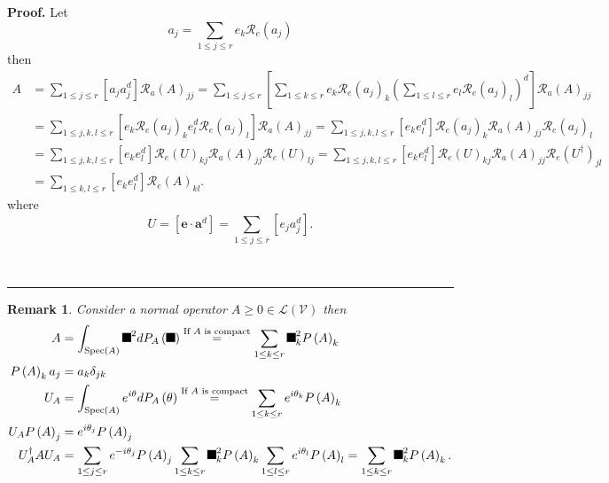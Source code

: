 \documentclass[aps,preprint]{revtex4}%
\providecommand{\U}[1]{\protect\rule{.1in}{.1in}}
\newtheorem{remark}[theorem]{Remark}
\newenvironment{proof}[1][Proof]{\noindent\textbf{#1.} }{\ \rule{0.5em}{0.5em}}
\begin{document}
\begin{proof}
Let
\begin{equation}
a_{j}=\sum_{1\leq j\leq r}e_{k}\mathcal{R}_{e}\left(  a_{j}\right)
\end{equation}
then
\begin{align}
A  &  =\sum_{1\leq j\leq r}\left[  a_{j}a_{j}^{d}\right]  \mathcal{R}%
_{a}\left(  A\right)  _{jj}=\sum_{1\leq j\leq r}\left[  \sum_{1\leq k\leq
r}e_{k}\mathcal{R}_{e}\left(  a_{j}\right)  _{k}\left(  \sum_{1\leq l\leq
r}e_{l}\mathcal{R}_{e}\left(  a_{j}\right)  _{l}\right)  ^{d}\right]
\mathcal{R}_{a}\left(  A\right)  _{jj}\\
&  =\sum_{1\leq j,k,l\leq r}\left[  e_{k}\mathcal{R}_{e}\left(  a_{j}\right)
_{k}e_{l}^{d}\mathcal{R}_{e}\left(  a_{j}\right)  _{l}\right]  \mathcal{R}%
_{a}\left(  A\right)  _{jj}=\sum_{1\leq j,k,l\leq r}\left[  e_{k}e_{l}%
^{d}\right]  \mathcal{R}_{e}\left(  a_{j}\right)  _{k}\mathcal{R}_{a}\left(
A\right)  _{jj}\mathcal{R}_{e}\left(  a_{j}\right)  _{l}\\
&  =\sum_{1\leq j,k,l\leq r}\left[  e_{k}e_{l}^{d}\right]  \mathcal{R}%
_{e}\left(  U\right)  _{kj}\mathcal{R}_{a}\left(  A\right)  _{jj}%
\mathcal{R}_{e}\left(  U\right)  _{lj}=\sum_{1\leq j,k,l\leq r}\left[
e_{k}e_{l}^{d}\right]  \mathcal{R}_{e}\left(  U\right)  _{kj}\mathcal{R}%
_{a}\left(  A\right)  _{jj}\mathcal{R}_{e}\left(  U^{\dagger}\right)  _{jl}\\
&  =\sum_{1\leq k,l\leq r}\left[  e_{k}e_{l}^{d}\right]  \mathcal{R}%
_{e}\left(  A\right)  _{kl}.
\end{align}
where
\begin{equation}
U=\left[  \mathbf{e\cdot a}^{d}\right]  =\sum_{1\leq j\leq r}\left[
e_{j}a_{j}^{d}\right]  .
\end{equation}

\end{proof}

\begin{remark}
Consider a normal operator $A\geq0\in\mathcal{L}\left(  \mathcal{V}\right)  $
then%
\begin{align}
A  &  =\int_{\operatorname*{Spec}\left(  A\right)  }\U{3c3} ^{2}dP_{A}\left(
\U{3c3} \right)  \overset{\text{If }A\text{ is compact}}{=}\sum_{1\leq k\leq
r}\U{3c3} _{k}^{2}P\left(  A\right)  _{k}\\
P\left(  A\right)  _{k}a_{j}  &  =a_{k}\delta_{jk}\\
U_{A}  &  =\int_{\operatorname*{Spec}\left(  A\right)  }e^{i\theta}%
dP_{A}\left(  \theta\right)  \overset{\text{If }A\text{ is compact}}{=}%
\sum_{1\leq k\leq r}e^{i\theta_{k}}P\left(  A\right)  _{k}\\
U_{A}P\left(  A\right)  _{j}  &  =e^{i\theta_{j}}P\left(  A\right)  _{j}\\
U_{A}^{\dagger}AU_{A}  &  =\sum_{1\leq j\leq r}e^{-i\theta_{j}}P\left(
A\right)  _{j}\sum_{1\leq k\leq r}\U{3c3} _{k}^{2}P\left(  A\right)  _{k}%
\sum_{1\leq l\leq r}e^{i\theta_{l}}P\left(  A\right)  _{l}=\sum_{1\leq k\leq
r}\U{3c3} _{k}^{2}P\left(  A\right)  _{k}.
\end{align}

\end{remark}
\end{document}
